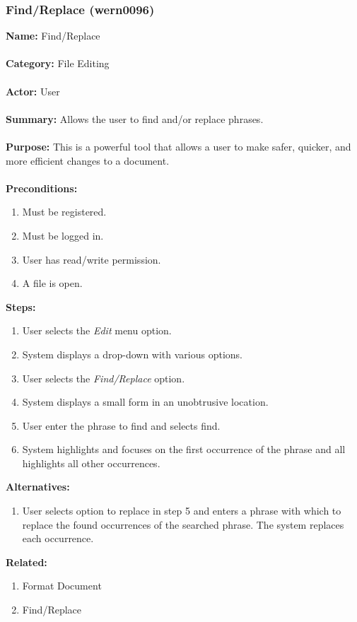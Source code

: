 \documentclass[11pt]{report}
\begin{document}
\newpage

\subsubsection{Find/Replace (wern0096)}
\begin{framed}
	\noindent\textbf{Name:} Find/Replace \\ \\
	\textbf{Category:} File Editing \\ \\
	\textbf{Actor:} User \\ \\
	\textbf{Summary:} Allows the user to find and/or replace phrases. \\ \\
	\textbf{Purpose:} This is a powerful tool that allows a user to make safer, quicker, and more efficient changes to a document. \\ \\
	\textbf{Preconditions:} 
	\begin{enumerate}
		\item Must be registered.
		\item Must be logged in.
		\item User has read/write permission.
		\item A file is open.
	\end{enumerate}
	\textbf{Steps:}
	\begin{enumerate}
		\item User selects the \textit{Edit} menu option.
		\item System displays a drop-down with various options.
		\item User selects the \textit{Find/Replace} option.
		\item System displays a small form in an unobtrusive location.
		\item User enter the phrase to find and selects find.
		\item System highlights and focuses on the first occurrence of the phrase and all highlights all other occurrences.
	\end{enumerate}
	\textbf{Alternatives:}
	\begin{enumerate}
		\item User selects option to replace in step 5 and enters a phrase with which to replace the found occurrences of the searched phrase. The system replaces each occurrence.
	\end{enumerate}
	\textbf{Related:}
	\begin{enumerate}
		\item Format Document
		\item Find/Replace
	\end{enumerate}
\end{framed}
\end{document}
